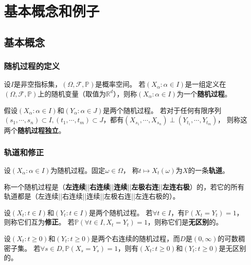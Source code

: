 \documentclass[main]{subfiles}
\begin{document}
\section{基本概念和例子}%
\subsection{基本概念}
\subsubsection{随机过程的定义}
\begin{definition}\label{def:stochestic_progress}
  设\(I\)是非空指标集，\((\Omega,\mathcal{F},\mathbb{P})\)是概率空间。
  若\((X_\alpha:\alpha \in I)\)是一组定义在\((\Omega,\mathcal{F},\mathbb{P})\)上的随机变量（取值为\(\mathbb{R}^d\)），则称\((X_\alpha:\alpha \in I)\)为一个\textbf{随机过程}。
\end{definition}
\begin{definition}\label{def:independent_of_stochestic_progress}
  假设\((X_\alpha:\alpha \in I)\)和\((Y_\alpha:\alpha \in J)\)是两个随机过程。
  若对于任何有限序列\((s_1,\cdots,s_n) \subset I,(t_1,\cdots,t_m) \subset J\)，都有\((X_{s_1},\cdots,X_{s_n}) \perp (Y_{t_1},\cdots,Y_{t_m})\)，
  则称这两个\textbf{随机过程独立}。
\end{definition}
\subsubsection{轨道和修正}
\begin{definition}\label{def:path}
  设\((X_\alpha:\alpha \in I)\)为随机过程。固定\(\omega \in \Omega\)，
  称\(t \mapsto X_{t}(\omega)\)为\(X\)的一条\textbf{轨道}。
\end{definition}
\begin{definition}\label{def:continous}
  称一个随机过程是（\textbf{左连续}||\textbf{右连续}||\textbf{连续}||\textbf{左极右连}||\textbf{左连右极}）的，若它的所有轨道都是（左连续||右连续||连续||左极右连||左连右极的）。
\end{definition}
\begin{definition}\label{def:same}
  设\((X_t:t \in I)\)和\((Y_t:t \in I)\)是两个随机过程。
  若\(\forall t \in I\)，有\(\mathbb{P}(X_t=Y_t)=1\)，则称它们互为\textbf{修正}。
  若\(\mathbb{P}(\forall t \in I,X_t=Y_t)=1\)，则称它们是\textbf{无区别}的。
\end{definition}
\begin{theorem}\label{the:1}
  设\((X_t:t \geq 0)\)和\((Y_t:t \geq 0)\)是两个右连续的随机过程，而\(D\)是\((0,\infty)\)的可数稠密子集。
  若\(\forall s \in D,\mathbb{P}(X_s=Y_s)=1\)，则有\((X_t:t \geq 0)\)和\((Y_t:t \geq 0)\)是无区别的。
\end{theorem}
\end{document}
